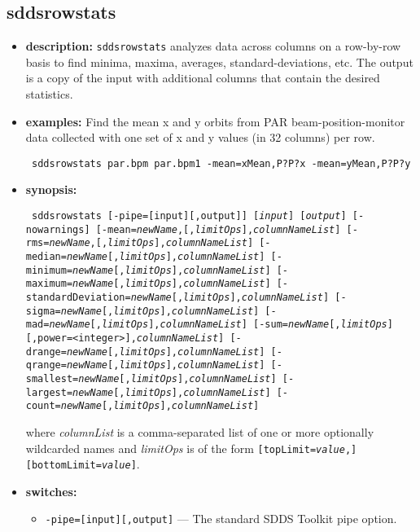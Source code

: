 \newpage
\subsection{sddsrowstats}
\label{sddsrowstats}

\begin{itemize}
\item {\bf description:}
{\tt sddsrowstats} analyzes data across columns on a row-by-row basis to
find minima, maxima, averages, standard-deviations, etc.
The output is a copy of the input with additional columns that contain
the desired statistics.
\item {\bf examples:}
Find the mean x and y orbits from PAR beam-position-monitor data collected
with one set of x and y values (in 32 columns) per row.
\begin{flushleft}{\tt
sddsrowstats par.bpm par.bpm1 -mean=xMean,P?P?x -mean=yMean,P?P?y
}\end{flushleft}
\item {\bf synopsis:}
\begin{flushleft}{\tt
sddsrowstats [-pipe=[input][,output]] [{\em input}] [{\em output}] 
[-nowarnings]
[-mean={\em newName},[,{\em limitOps}],{\em columnNameList}]
[-rms={\em newName},[,{\em limitOps}],{\em columnNameList}]
[-median={\em newName}[,{\em limitOps}],{\em columnNameList}]
[-minimum={\em newName}[,{\em limitOps}],{\em columnNameList}]
[-maximum={\em newName}[,{\em limitOps}],{\em columnNameList}]
[-standardDeviation={\em newName}[,{\em limitOps}],{\em columnNameList}]
[-sigma={\em newName}[,{\em limitOps}],{\em columnNameList}]
[-mad={\em newName}[,{\em limitOps}],{\em columnNameList}]
[-sum={\em newName}[,{\em limitOps}][,power=<integer>],{\em columnNameList}] 
[-drange={\em newName}[,{\em limitOps}],{\em columnNameList}]
[-qrange={\em newName}[,{\em limitOps}],{\em columnNameList}]
[-smallest={\em newName}[,{\em limitOps}],{\em columnNameList}]
[-largest={\em newName}[,{\em limitOps}],{\em columnNameList}]
[-count={\em newName}[,{\em limitOps}],{\em columnNameList}]
}\end{flushleft}
where {\em columnList} is a comma-separated list of one or more optionally wildcarded names and
{\em limitOps} is of the form {\tt [topLimit={\em value},][bottomLimit={\em value}]}.
\item {\bf switches:}
    \begin{itemize}
    \item {\tt -pipe=[input][,output]} --- The standard SDDS Toolkit pipe option.

\end{itemize}
\end{itemize}
